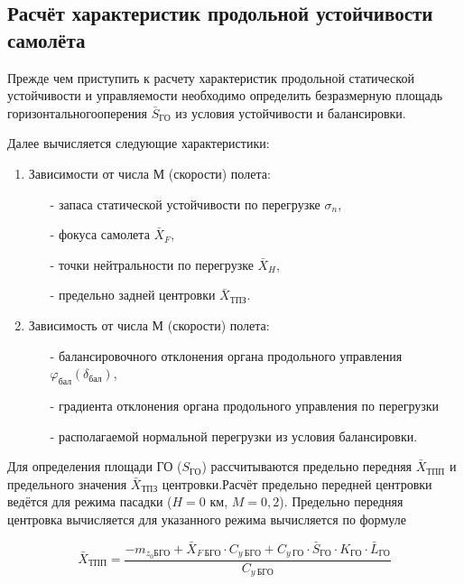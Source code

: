 \subsection{Расчёт характеристик продольной устойчивости самолёта}
\label{sec:Расчёт характеристик продольной устойчивости самолёта}

Прежде чем приступить к расчету характеристик продольной статической устойчивости и управляемости необходимо определить безразмерную площадь горизонтальногооперения $\bar{S}_\text{ГО}$ из условия устойчивости и балансировки.

Далее вычисляется следующие характеристики:
\begin{enumerate}
    \item Зависимости от числа М (скорости) полета:
    \begin{itemize}
        \item [-] запаса статической устойчивости по перегрузке $\sigma_n$,
        \item [-] фокуса самолета $\bar{X}_F$,
        \item [-] точки нейтральности по перегрузке $\bar{X}_H$,
        \item [-] предельно задней центровки $\bar{X}_\text{ТПЗ}$.
    \end{itemize}
    \item Зависимость от числа М (скорости) полета:
    \begin{itemize}
        \item [-] балансировочного отклонения органа продольного управления $\varphi_\text{бал}(\delta_\text{бал})$,
        \item [-] градиента отклонения органа продольного управления по перегрузки
        \item [-] располагаемой нормальной перегрузки из условия балансировки.
    \end{itemize}
\end{enumerate}

Для определения площади ГО ($S_\text{ГО}$) рассчитываются предельно передняя $\bar{X}_\text{ТПП}$ и предельного значения $\bar{X}_\text{ТПЗ}$ центровки.Расчёт предельно передней центровки ведётся для режима пасадки ($H = 0$ км, $M = 0,2$). Предельно передняя центровка вычисляется для указанного режима вычисляется по формуле

\begin{equation}
    \label{eq:Предельно передняя центровка}
    \bar{X}_\text{ТПП} = \frac{-m_{z_0 \text{БГО}} + \bar{X}_{F \ \text{БГО}}  \cdot  C_{y \ \text{БГО}} + C_{y \ \text{ГО}} \cdot \bar{S}_\text{ГО} \cdot K_\text{ГО} \cdot \bar{L}_\text{ГО}}{C_{y \ \text{БГО}}}
\end{equation}

